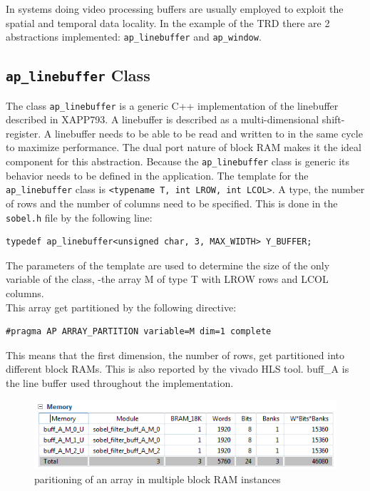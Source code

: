 \documentclass[a4paper]{report}
\begin{document}
In systems doing video processing buffers are usually employed to exploit the spatial and temporal data locality. In the example of the TRD there are 2 abstractions implemented: \texttt{ap\_linebuffer} and \texttt{ap\_window}.

\subsection{\texttt{ap\_linebuffer} Class}

The class \texttt{ap\_linebuffer} is a generic C++ implementation of the linebuffer described in XAPP793. A linebuffer is described as a multi-dimensional shift-register. A linebuffer needs to be able to be read and written to in the same cycle to maximize performance. The dual port nature of block RAM makes it the ideal component for this abstraction.
Because the \texttt{ap\_linebuffer} class is generic its behavior needs to be defined in the application. The template for the \texttt{ap\_linebuffer} class is \texttt{<typename T, int LROW, int LCOL>}. A type, the number of rows and the number of columns need to be specified. This is done in the \texttt{sobel.h} file by the following line:

\begin{verbatim}
typedef ap_linebuffer<unsigned char, 3, MAX_WIDTH> Y_BUFFER;
\end{verbatim}

The parameters of the template are used to determine the size of the only variable of the class, -the array M of type T with LROW rows and LCOL columns.\\
This array get partitioned by the following directive:

\begin{verbatim}
#pragma AP ARRAY_PARTITION variable=M dim=1 complete
\end{verbatim}

This means that the first dimension, the number of rows, get partitioned into different block RAMs. This is also reported by the vivado HLS tool. buff\_A is the line buffer used throughout the implementation.\\

\medskip

\begin{figure}[h]
\centering
\includegraphics[scale=0.8]{images/trd_original_buffer_partitioning.PNG} 
\caption{paritioning of an array in multiple block RAM instances}
\end{figure}
\end{document}
